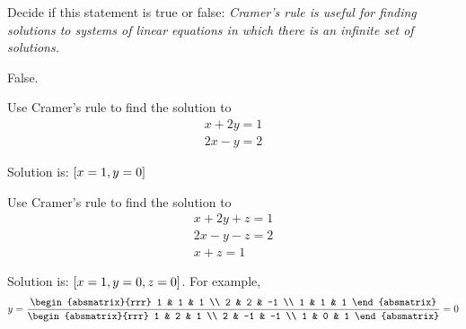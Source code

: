 \begin{enumialphparenastyle}

\begin{ex}Decide if this statement is true or false: \textit{Cramer's rule is useful for finding solutions to systems of linear
equations in which there is an infinite set of solutions.} 
\begin{sol}
False.
\end{sol}
\end{ex}

\begin{ex} Use Cramer's rule to find the solution to 
\begin{equation*}
\begin{array}{c}
x+2y=1 \\
2x-y=2
\end{array}
\end{equation*}
\begin{sol}
Solution is: $\left[x=1,y=0\right] $
\end{sol}
\end{ex}

\begin{ex} Use Cramer's rule to find the solution to 
\begin{equation*}
\begin{array}{c}
x+2y+z=1 \\
2x-y-z=2 \\
x+z=1
\end{array}
\end{equation*}
\begin{sol}
Solution is: $\left[x=1,y=0,z=0\right]$. For example,
\[
y=\frac{\begin{absmatrix}{rrr}
1 & 1 & 1 \\
2 & 2 & -1 \\
1 & 1 & 1
\end{absmatrix}}{\begin{absmatrix}{rrr}
1 & 2 & 1 \\
2 & -1 & -1 \\
1 & 0 & 1
\end{absmatrix}}=0
\]
\end{sol}
\end{ex}

\end{enumialphparenastyle}